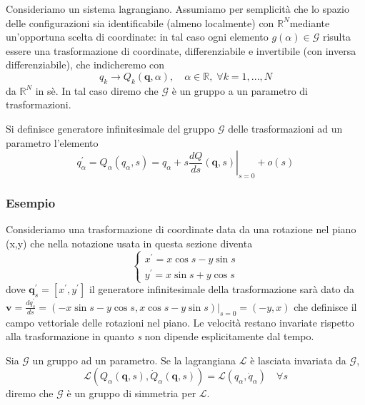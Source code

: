 \noindent Consideriamo un sistema lagrangiano. Assumiamo per semplicit\`{a} che lo
spazio delle configurazioni sia identificabile (almeno localmente) con $\mathbb{R}^N$mediante
un'opportuna scelta di coordinate: in tal caso ogni elemento $g(\alpha) \in \mathcal{G}$ risulta essere
una trasformazione di coordinate, differenziabile e invertibile (con inversa differenziabile), che indicheremo con
\begin{equation}
q_k \rightarrow Q_k(\bm{q}, \alpha), \quad \alpha \in \mathbb{R}, \;\forall k=1,...,N
\end{equation}
da $\mathbb{R}^N$ in s\`{e}. In tal caso diremo che $\mathcal{G}$ \`{e} un gruppo a un parametro di trasformazioni.

\begin{definition}
	Si definisce generatore infinitesimale del gruppo $\mathcal{G}$ delle trasformazioni ad un parametro l'elemento
	\begin{equation}
q_\alpha^{\prime}=Q_\alpha\left(q_\alpha, s\right)=q_\alpha+\left.s \frac{d Q}{d s}(\bm{q}, s)\right|_{s=0}+o(s)
\end{equation}
\end{definition}

\subsubsection{Esempio}

Consideriamo una trasformazione di coordinate data da una rotazione nel piano (x,y) che nella notazione usata in questa sezione diventa 
\begin{equation*}
	 \left\{\begin{array}{l}
x^{\prime}=x \cos s-y \sin s \\
y^{\prime}=x \sin s+y \cos s
\end{array}\right.
\end{equation*}
dove $\bm{q}^{\prime}_s = [x^{\prime}, y^{\prime}] $ il generatore infinitesimale della trasformazione sar\`{a} dato da $\bm{v} = \frac{d q^{\prime}_s}{ds} = (-x \sin s-y \cos s, x \cos s-y \sin s)\vert_{s=0} = (-y,x)$ che definisce il campo vettoriale delle rotazioni nel piano. Le velocit\`{a} restano invariate rispetto alla trasformazione in quanto \textit{s} non dipende esplicitamente dal tempo.

\begin{definition}
	Sia $\mathcal{G}$ un gruppo ad un parametro. Se la lagrangiana $\mathcal{L}$ \`{e} lasciata invariata da $\mathcal G$, 
	\begin{equation}
\mathcal{L}\left(Q_\alpha(\bm{q}, s), \dot{Q}_\alpha(\bm{q}, s)\right)=\mathcal{L}\left(q_\alpha, \dot{q}_{\alpha} \right) \quad \forall s
\end{equation}
	diremo che $\mathcal{G}$ \`{e} un gruppo di simmetria per $\mathcal{L}$.
\end{definition}

